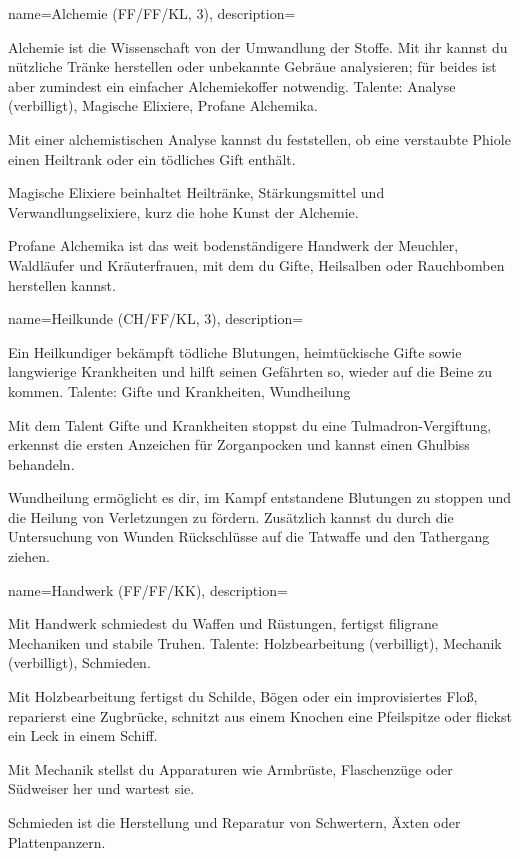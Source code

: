 {
    name={Alchemie (FF/FF/KL, 3)},
    description={Alchemie ist die Wissenschaft von der Umwandlung der Stoffe. Mit ihr kannst du nützliche Tränke herstellen oder unbekannte Gebräue analysieren; für beides ist aber zumindest ein einfacher Alchemiekoffer notwendig. Talente: Analyse (verbilligt), Magische Elixiere, Profane Alchemika.
\begin{description}
\item Mit einer alchemistischen Analyse kannst du feststellen, ob eine verstaubte Phiole einen Heiltrank oder ein tödliches Gift enthält.
\item Magische Elixiere beinhaltet Heiltränke, Stärkungsmittel und Verwandlungselixiere, kurz die hohe Kunst der Alchemie.
\item Profane Alchemika ist das weit bodenständigere Handwerk der Meuchler, Waldläufer und Kräuterfrauen, mit dem du Gifte, Heilsalben oder Rauchbomben herstellen kannst.
\end{description}}}

{
    name={Heilkunde (CH/FF/KL, 3)},
    description={Ein Heilkundiger bekämpft tödliche Blutungen, heimtückische Gifte sowie langwierige Krankheiten und hilft seinen Gefährten so, wieder auf die Beine zu kommen. Talente: Gifte und Krankheiten, Wundheilung
\begin{description}
\item Mit dem Talent Gifte und Krankheiten stoppst du eine Tulmadron-Vergiftung, erkennst die ersten Anzeichen für Zorganpocken und kannst einen Ghulbiss behandeln.
\item Wundheilung ermöglicht es dir, im Kampf entstandene Blutungen zu stoppen und die Heilung von Verletzungen zu fördern. Zusätzlich kannst du durch die Untersuchung von Wunden Rückschlüsse auf die Tatwaffe und den Tathergang ziehen.
\end{description}}}

{
    name={Handwerk (FF/FF/KK)},
    description={Mit Handwerk schmiedest du Waffen und Rüstungen, fertigst filigrane Mechaniken und stabile Truhen. Talente: Holzbearbeitung (verbilligt), Mechanik (verbilligt), Schmieden.
\begin{description}
\item Mit Holzbearbeitung fertigst du Schilde, Bögen oder ein improvisiertes Floß, reparierst eine Zugbrücke, schnitzt aus einem Knochen eine Pfeilspitze oder flickst ein Leck in einem Schiff.
\item Mit Mechanik stellst du Apparaturen wie Armbrüste, Flaschenzüge oder Südweiser her und wartest sie.
\item Schmieden ist die Herstellung und Reparatur von Schwertern, Äxten oder Plattenpanzern.
\end{description}}}
    
